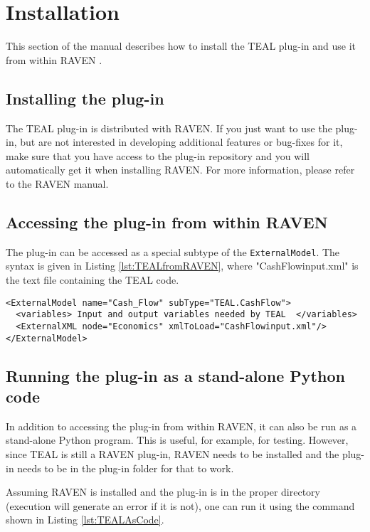 \section{Installation}
\label{sec:Installation}

This section of the manual describes how to install the TEAL plug-in and use it from within RAVEN \cite{RAVEN}.

\subsection{Installing the plug-in}
The TEAL plug-in is distributed with RAVEN. If you just want to use the plug-in, but are not interested in developing additional features or bug-fixes for it, make sure that you have access to the plug-in repository and you will automatically get it when installing RAVEN.
For more information, please refer to the RAVEN manual.

\subsection{Accessing the plug-in from within RAVEN}
The plug-in can be accessed as a special subtype of the \texttt{ExternalModel}. The syntax is given in Listing \ref{lst:TEALfromRAVEN}, where "CashFlowinput.xml" is the text file containing the TEAL code.

\begin{lstlisting}[style=XML,morekeywords={anAttribute},caption=Call TEAL.CashFlow from RAVEN input., label=lst:TEALfromRAVEN]
<ExternalModel name="Cash_Flow" subType="TEAL.CashFlow">
  <variables> Input and output variables needed by TEAL  </variables>
  <ExternalXML node="Economics" xmlToLoad="CashFlowinput.xml"/>
</ExternalModel>
\end{lstlisting}

\subsection{Running the plug-in as a stand-alone Python code}

In addition to accessing the plug-in from within RAVEN, it can also be run as a stand-alone Python program. This is useful, for example, for testing. However,
since TEAL is still a RAVEN plug-in, RAVEN needs to be installed and the plug-in needs to be in the plug-in folder for that to work.

Assuming RAVEN is installed and the plug-in is in the proper directory (execution will generate an error if it is not), one can run it using the command shown in Listing \ref{lst:TEALAsCode}.


